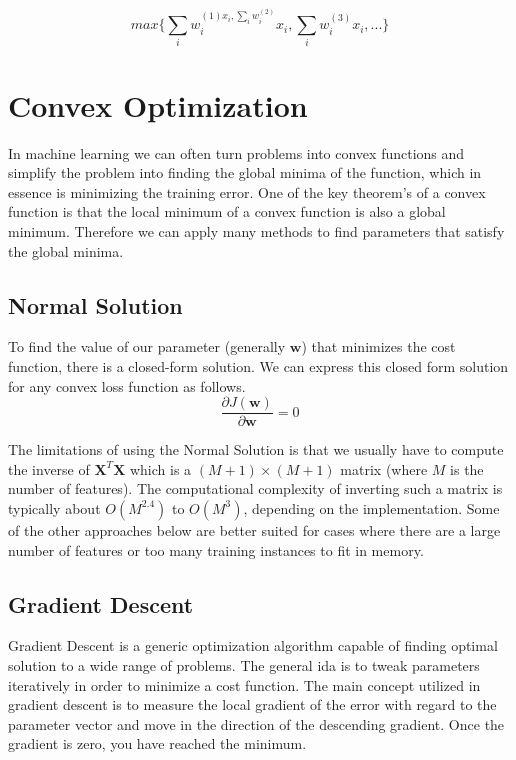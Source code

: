 \documentclass[12pt]{article}
\begin{document}
            $$ max \{ \sum_i w_i^{(1) x_i, \sum_i w_i^{(2)}} x_i, \sum_i w_i^{(3)}x_i, ...\} $$

\section{Convex Optimization} \label{sec:ConvexOptimization}
    In machine learning we can often turn problems into convex functions and simplify the problem into finding the
    global minima of the function, which in essence is minimizing the training error. One of the key theorem's of a
    convex function is that the local minimum of a convex function is also a global minimum. Therefore we can apply many
    methods to find parameters that satisfy the global minima.

    \subsection{Normal Solution} \label{sec:NormalSolution}
        To find the value of our parameter (generally $\boldsymbol{w}$) that minimizes the cost function, there is a
        closed-form solution. We can express this closed form solution for any convex loss function as follows.
        $$ \frac{\partial J(\boldsymbol{w})}{\partial \boldsymbol{w}} = 0 $$
        
        The limitations of using the Normal Solution is that we usually have to compute the inverse of
        $\boldsymbol{X}^T\boldsymbol{X}$ which is a $(M+1) \times (M+1)$ matrix (where $M$ is the number of features).
        The computational complexity of inverting such a matrix is typically about $O(M^{2.4})$ to $O(M^{3})$, depending
        on the implementation. Some of the other approaches below are better suited for cases where there are a large
        number of features or too many training instances to fit in memory.

    \subsection{Gradient Descent} \label{sec:GD}
        Gradient Descent is a generic optimization algorithm capable of finding optimal solution to a wide range of
        problems. The general ida is to tweak parameters iteratively in order to minimize a cost function. The main
        concept utilized in gradient descent is to measure the local gradient of the error with regard to the parameter
        vector and move in the direction of the descending gradient. Once the gradient is zero, you have reached the
        minimum.
\end{document}
